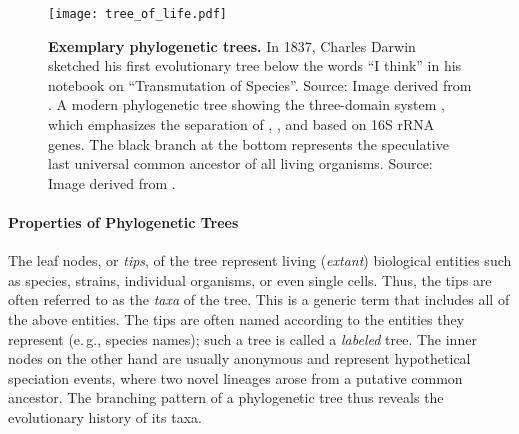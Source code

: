 \begin{figure}[hpbt]
    \centering
    \texttt{[image: tree\_of\_life.pdf]}
    \begin{subfigure}{0pt}
        \label{fig:tree_of_life:sub:darwin}
    \end{subfigure}
    \begin{subfigure}{0pt}
        \label{fig:tree_of_life:sub:woese}
    \end{subfigure}
    \caption[Exemplary phylogenetic trees]{
        \textbf{Exemplary phylogenetic trees.}
        In 1837, Charles Darwin sketched his first evolutionary tree below the words ``I think''
        in his notebook on ``Transmutation of Species''.
        Source: Image derived from \cite{DarwinTreeOfLife1837}.
        A modern phylogenetic tree showing the three-domain system \cite{Woese1977,Woese1990},
        which emphasizes the separation of , , and 
        based on 16S rRNA genes.
        The black branch at the bottom represents the speculative last universal common ancestor of all living organisms.
        Source: Image derived from \cite{WoeseTreeOfLife2006}.
    }
    \label{fig:tree_of_life}
\end{figure}

\paragraph{Properties of Phylogenetic Trees}
\label{ch:Foundations:sec:TreeOfLife:sub:PhylogeneticTrees:par:TreeProperties}

The leaf nodes, or \emph{tips}, of the tree represent living (\emph{extant}) biological entities
such as species, strains, individual organisms, or even single cells. %
Thus, the tips are often referred to as the \emph{taxa} of the tree.
This is a generic term that includes all of the above entities.
The tips are often named according to the entities they represent (e.\,g., species names);
such a tree is called a \emph{labeled} tree.
The inner nodes on the other hand are usually anonymous and
represent hypothetical speciation events, where two novel lineages arose from a putative common ancestor.
The branching pattern of a phylogenetic tree thus reveals the evolutionary history of its taxa.

